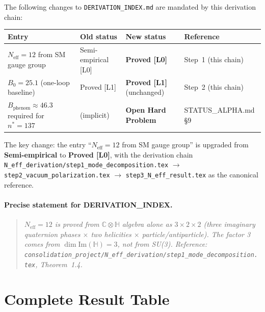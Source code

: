 \documentclass[12pt,a4paper]{article}
\theoremstyle{definition}
\theoremstyle{remark}
\newcommand{\C}{\mathbb{C}}
\renewcommand{\H}{\mathbb{H}}
\newcommand{\Neff}{N_{\mathrm{eff}}}
\begin{document}
The following changes to \texttt{DERIVATION\_INDEX.md} are mandated by
this derivation chain:

\begin{center}
\begin{tabular}{p{4.5cm}p{3.5cm}p{4cm}p{2.5cm}}
  \toprule
  \textbf{Entry} & \textbf{Old status} & \textbf{New status} & \textbf{Reference} \\
  \midrule
  $\Neff = 12$ from SM gauge group
  & Semi-empirical [L0]
  & \textcolor{provengreen}{\textbf{Proved [L0]}}
  & Step~1 (this chain) \\[4pt]
  $B_0 = 25.1$ (one-loop baseline)
  & Proved [L1]
  & \textcolor{provengreen}{\textbf{Proved [L1]}} (unchanged)
  & Step~2 (this chain) \\[4pt]
  $B_\mathrm{phenom} \approx 46.3$ required for $n^*=137$
  & (implicit)
  & \textcolor{openred}{\textbf{Open Hard Problem}}
  & STATUS\_ALPHA.md §9 \\
  \bottomrule
\end{tabular}
\end{center}

The key change: the entry ``$\Neff = 12$ from SM gauge group''
is upgraded from \textbf{Semi-empirical} to \textbf{Proved [L0]},
with the derivation chain
\texttt{N\_eff\_derivation/step1\_mode\_decomposition.tex} $\to$
\texttt{step2\_vacuum\_polarization.tex} $\to$
\texttt{step3\_N\_eff\_result.tex}
as the canonical reference.

\paragraph{Precise statement for DERIVATION\_INDEX.}
\begin{quote}
\textit{$\Neff = 12$ is proved from $\C \otimes \H$ algebra alone as
$3 \times 2 \times 2$ (three imaginary quaternion phases $\times$ two
helicities $\times$ particle/antiparticle).  The factor 3 comes from
$\dim \mathrm{Im}(\H) = 3$, not from SU(3).
Reference: \texttt{consolidation\_project/N\_eff\_derivation/step1\_mode\_decomposition.tex},
Theorem~1.4.}
\end{quote}

\section{Complete Result Table}
\label{sec:full_table}
\end{document}
